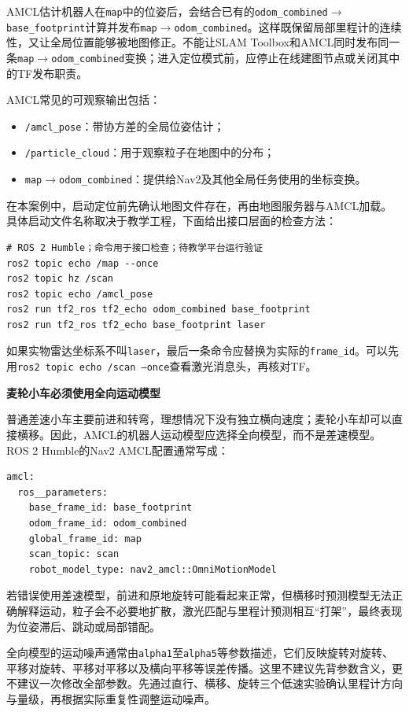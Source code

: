 \documentclass[UTF8,zihao=-4]{ctexart}
\DeclareRobustCommand{\code}[1]{\texttt{#1}}
\begin{document}
AMCL估计机器人在\code{map}中的位姿后，会结合已有的\code{odom\_combined}$\rightarrow$\code{base\_footprint}计算并发布\code{map}$\rightarrow$\code{odom\_combined}。这样既保留局部里程计的连续性，又让全局位置能够被地图修正。不能让SLAM Toolbox和AMCL同时发布同一条\code{map}$\rightarrow$\code{odom\_combined}变换；进入定位模式前，应停止在线建图节点或关闭其中的TF发布职责。

AMCL常见的可观察输出包括：

\begin{itemize}
  \item \code{/amcl\_pose}：带协方差的全局位姿估计；
  \item \code{/particle\_cloud}：用于观察粒子在地图中的分布；
  \item \code{map}$\rightarrow$\code{odom\_combined}：提供给Nav2及其他全局任务使用的坐标变换。
\end{itemize}

在本案例中，启动定位前先确认地图文件存在，再由地图服务器与AMCL加载。具体启动文件名称取决于教学工程，下面给出接口层面的检查方法：

\begin{verbatim}
# ROS 2 Humble；命令用于接口检查；待教学平台运行验证
ros2 topic echo /map --once
ros2 topic hz /scan
ros2 topic echo /amcl_pose
ros2 run tf2_ros tf2_echo odom_combined base_footprint
ros2 run tf2_ros tf2_echo base_footprint laser
\end{verbatim}

如果实物雷达坐标系不叫\code{laser}，最后一条命令应替换为实际的\code{frame\_id}。可以先用\code{ros2 topic echo /scan --once}查看激光消息头，再核对TF。

\textbf{麦轮小车必须使用全向运动模型}

普通差速小车主要前进和转弯，理想情况下没有独立横向速度；麦轮小车却可以直接横移。因此，AMCL的机器人运动模型应选择全向模型，而不是差速模型。ROS 2 Humble的Nav2 AMCL配置通常写成：

\begin{verbatim}
amcl:
  ros__parameters:
    base_frame_id: base_footprint
    odom_frame_id: odom_combined
    global_frame_id: map
    scan_topic: scan
    robot_model_type: nav2_amcl::OmniMotionModel
\end{verbatim}

若错误使用差速模型，前进和原地旋转可能看起来正常，但横移时预测模型无法正确解释运动，粒子会不必要地扩散，激光匹配与里程计预测相互“打架”，最终表现为位姿滞后、跳动或局部错配。

全向模型的运动噪声通常由\code{alpha1}至\code{alpha5}等参数描述，它们反映旋转对旋转、平移对旋转、平移对平移以及横向平移等误差传播。这里不建议先背参数含义，更不建议一次修改全部参数。先通过直行、横移、旋转三个低速实验确认里程计方向与量级，再根据实际重复性调整运动噪声。
\end{document}
